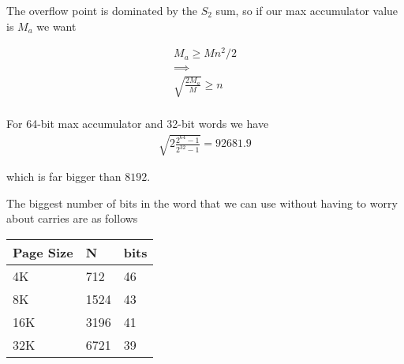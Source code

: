 \documentclass{article}
\begin{document}
The overflow point is dominated by the $S_2$ sum, so if our max accumulator value is $M_a$ we want

\begin{align*}
M_a \ge M n^2/2 \\
\implies \\
\sqrt{\frac{ 2 M_a }{ M}} \ge n \\
\end{align*}

For 64-bit max accumulator and 32-bit words we have
\begin{align*}
\sqrt{2 \frac{2^{64} - 1}{2^{32} - 1}} = 92 681.9
\end{align*}

which is far bigger than $8192$.


The biggest number of bits in the word that we can use without having to worry about carries are as follows

\begin{tabular}{|l|l|l|}
\hline
Page Size & N & bits \\
\hline
4K & 712 & 46 \\
8K & 1524 & 43 \\
16K & 3196 & 41 \\
32K & 6721 & 39 \\
\hline
\end{tabular}


%

%
%
\end{document}
